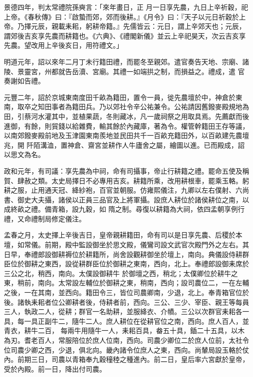 \begin{pinyinscope}
 景德四年，判太常禮院孫奭言：「來年畫日，正
 月一日享先農，九日上辛祈穀，祀上帝。《春秋傳》曰：『啟蟄而郊，郊而後耕。』《月令》曰：『天子以元日祈穀於上帝。乃擇元辰，親載耒耜，躬耕帝籍。』先儒皆云：元日，謂上辛郊天也；元辰，謂郊後吉亥享先農而耕籍也。《六典》、《禮閣新儀》並云上辛祀昊天，次云吉亥享先農。望改用上辛後亥日，用符禮文。」



 明道元年，詔以來年二月丁未行籍田禮，而罷冬至親郊。遣官奏告天地、宗廟、諸陵、景靈宮，州都就告岳瀆、宮廟。其禮一如端拱之制，而損益之。禮成，遣
 官奏謝如告禮。



 元豐二年，詔於京城東南度田千畝為籍田，置令一員，徙先農壇於中，神倉於東南，取卒之知田事者為籍田兵。乃以郊社令辛公祐兼令。公祐請因舊鏺麥殿規地為田，引蔡河水灌其中，並植果蔬，冬則藏冰，凡一歲祠祭之用取具焉。先薦獻而後進御，有餘，則貿錢以給雜費，輸其餘於內藏庫，著為令。權管幹籍田王存等議，以南郊鏺麥殿前地及玉津園東南羨地並民田共千一百畝充籍田外，以百畝建先農壇兆，開
 阡陌溝洫，置神倉、齋宮並耕作人牛廬舍之屬，繪圖以進。已而殿成，詔以思文為名。



 政和元年，有司議：享先農為中祠，命有司攝事，帝止行耕籍之禮。罷命五使及稱賀、肆赦之類。太史局擇日不必專用吉亥。耕籍所乘，改用耕根車，罷乘玉輅。躬耕之服，止用通天冠、絳紗袍，百官並朝服。仿雍熙儀注，九卿以左右僕射、六尚書、御史大夫攝，諸侯以正員三品官及上將軍攝。設庶人耕位於諸侯耕位之南，以成終畝之禮。備青箱，設九穀，如
 隋之制。尋復以耕籍為大祠，依四孟朝享例行禮，又命禮制局修定儀注。



 孟春之月，太史擇上辛後吉日，皇帝親耕籍田，命有司以是日享先農、后稷於本壇，如常儀。前期，殿中監設御坐於思文殿，儀鸞司設文武官次殿門外之左右。其日早，奉禮郎設御耕褥位於耕籍所，尚舍設觀耕御坐於壇上，南向。典儀設侍耕群臣位於御耕之東西，設從耕群臣位於御耕之東南，西向，北上。奉禮郎設御耒席於三公之北，稍西，南向。太僕設御耕牛
 於御壇之西，稍北；太僕卿位於耕牛之東，稍前，南向。太常設左輔位於御耕之東，稍南，西向；設司農位二，一在左輔之後，一在其南，並西向。籍田令三，皆位司農卿南，少退，北上。奉青箱官位於後。諸執耒耜者位公卿耕者後，侍耕者前，西向。三公、三少、宰臣、親王等每員三人，執政二人，從耕；群官一名助耕，並服絳衣、介幘。三公以次群官耒耜各一具，每一具正副牛二，隨牛二人。庶人耕位在從耕官位之南，西向。庶人百人，並青衣，耕牛二百，
 每兩牛用隨牛一人，耒耜百具，畚五十具，鍤二十五具，以木為刃。耆老百人，常服陪位於庶人位南，西向。司農少卿位二於庶人位前，太社令位司農少卿之西，少退，俱北向。畿內諸令位庶人之東，西向。尚輦局設玉輅於仗內。前期三日，司農以青箱奉九穀穜稑之種進內。前二日，皇后率六宮獻於皇帝，受於內殿。前一日，降出付司農。




\end{pinyinscope}
